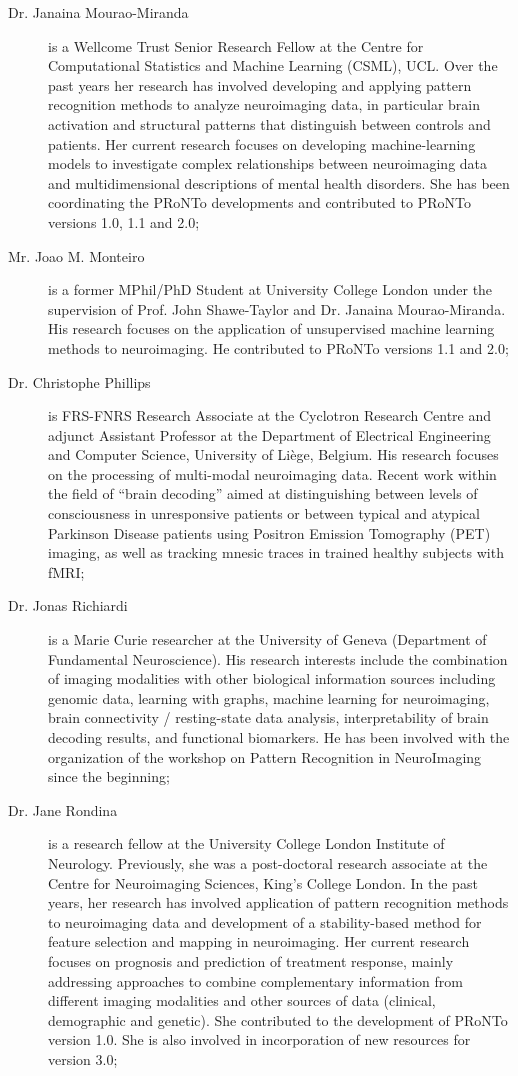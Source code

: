 \begin{description}
	\item[Dr. Janaina Mourao-Miranda] is a Wellcome Trust Senior Research Fellow at the Centre for Computational Statistics and Machine Learning (CSML), UCL.  Over the past years her research has involved developing and applying pattern recognition methods to analyze neuroimaging data, in particular brain activation and structural patterns that distinguish between controls and patients. Her current research focuses on developing machine-learning models to investigate complex relationships between neuroimaging data and multidimensional descriptions of mental health disorders. She has been coordinating the PRoNTo developments and contributed to PRoNTo versions 1.0, 1.1 and 2.0;
	\item[Mr. Joao M. Monteiro] is a former MPhil/PhD Student at University College London under the supervision of Prof. John Shawe-Taylor and Dr. Janaina Mourao-Miranda. His research focuses on the application of unsupervised machine learning methods to neuroimaging. He contributed to PRoNTo versions 1.1 and 2.0;
	\item[Dr. Christophe Phillips] is FRS-FNRS Research Associate at the Cyclotron Research Centre and adjunct Assistant Professor at the Department of Electrical Engineering and Computer Science, University of Li\`ege, Belgium. His research focuses on the processing of multi-modal neuroimaging data. Recent work within the field of ``brain decoding'' aimed at distinguishing between levels of consciousness in unresponsive patients or between typical and atypical Parkinson Disease patients using Positron Emission Tomography (PET) imaging, as well as tracking mnesic traces in trained healthy subjects with fMRI;
	\item[Dr. Jonas Richiardi] is a Marie Curie researcher at the University of Geneva (Department of Fundamental Neuroscience). His research interests include the combination of imaging modalities with other biological information sources including genomic data, learning with graphs, machine learning for neuroimaging, brain connectivity / resting-state data analysis, interpretability of brain decoding results, and functional biomarkers. He has been involved with the organization of the workshop on Pattern Recognition in NeuroImaging since the beginning;
	\item[Dr. Jane Rondina] is a research fellow at the University College London Institute of Neurology. Previously, she was a post-doctoral research associate at the Centre for Neuroimaging Sciences, King's College London. In the past years, her research has involved application of pattern recognition methods to neuroimaging data and development of a stability-based method for feature selection and mapping in neuroimaging. Her current research focuses on prognosis and prediction of treatment response, mainly addressing approaches to combine complementary information from different imaging modalities and other sources of data (clinical, demographic and genetic). She contributed to the development of PRoNTo version 1.0. She is also involved in incorporation of new resources for version 3.0;

\end{description}
